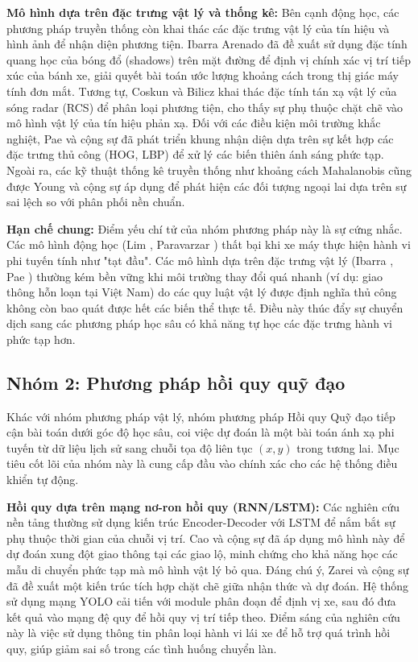 	\textbf{Mô hình dựa trên đặc trưng vật lý và thống kê:}
	Bên cạnh động học, các phương pháp truyền thống còn khai thác các đặc trưng vật lý của tín hiệu và hình ảnh để nhận diện phương tiện. Ibarra Arenado \cite{Ibarra2016} đã đề xuất sử dụng đặc tính quang học của bóng đổ (shadows) trên mặt đường để định vị chính xác vị trí tiếp xúc của bánh xe, giải quyết bài toán ước lượng khoảng cách trong thị giác máy tính đơn mắt. Tương tự, Coskun và Bilicz \cite{Coskun2024} khai thác đặc tính tán xạ vật lý của sóng radar (RCS) để phân loại phương tiện, cho thấy sự phụ thuộc chặt chẽ vào mô hình vật lý của tín hiệu phản xạ.
	Đối với các điều kiện môi trường khắc nghiệt, Pae và cộng sự \cite{Pae2018} đã phát triển khung nhận diện dựa trên sự kết hợp các đặc trưng thủ công (HOG, LBP) để xử lý các biến thiên ánh sáng phức tạp. Ngoài ra, các kỹ thuật thống kê truyền thống như khoảng cách Mahalanobis cũng được Young và cộng sự \cite{Young2016} áp dụng để phát hiện các đối tượng ngoại lai dựa trên sự sai lệch so với phân phối nền chuẩn.

	\textbf{Hạn chế chung:}
	Điểm yếu chí tử của nhóm phương pháp này là sự cứng nhắc. Các mô hình động học (Lim \cite{Lim2018}, Paravarzar \cite{Paravarzar2020}) thất bại khi xe máy thực hiện hành vi phi tuyến tính như "tạt đầu". Các mô hình dựa trên đặc trưng vật lý (Ibarra \cite{Ibarra2016}, Pae \cite{Pae2018}) thường kém bền vững khi môi trường thay đổi quá nhanh (ví dụ: giao thông hỗn loạn tại Việt Nam) do các quy luật vật lý được định nghĩa thủ công không còn bao quát được hết các biến thể thực tế. Điều này thúc đẩy sự chuyển dịch sang các phương pháp học sâu có khả năng tự học các đặc trưng hành vi phức tạp hơn.
    
	\subsection{Nhóm 2: Phương pháp hồi quy quỹ đạo}

	Khác với nhóm phương pháp vật lý, nhóm phương pháp Hồi quy Quỹ đạo tiếp cận bài toán dưới góc độ học sâu, coi việc dự đoán là một bài toán ánh xạ phi tuyến từ dữ liệu lịch sử sang chuỗi tọa độ liên tục $(x, y)$ trong tương lai. Mục tiêu cốt lõi của nhóm này là cung cấp đầu vào chính xác cho các hệ thống điều khiển tự động.

	\textbf{Hồi quy dựa trên mạng nơ-ron hồi quy (RNN/LSTM):}
	Các nghiên cứu nền tảng thường sử dụng kiến trúc Encoder-Decoder với LSTM để nắm bắt sự phụ thuộc thời gian của chuỗi vị trí. Cao và cộng sự \cite{Cao2021} đã áp dụng mô hình này để dự đoán xung đột giao thông tại các giao lộ, minh chứng cho khả năng học các mẫu di chuyển phức tạp mà mô hình vật lý bỏ qua.
	Đáng chú ý, Zarei và cộng sự \cite{Zarei2023} đã đề xuất một kiến trúc tích hợp chặt chẽ giữa nhận thức và dự đoán. Hệ thống sử dụng mạng YOLO cải tiến với module phân đoạn để định vị xe, sau đó đưa kết quả vào mạng đệ quy để hồi quy vị trí tiếp theo. Điểm sáng của nghiên cứu này là việc sử dụng thông tin phân loại hành vi lái xe để hỗ trợ quá trình hồi quy, giúp giảm sai số trong các tình huống chuyển làn.

